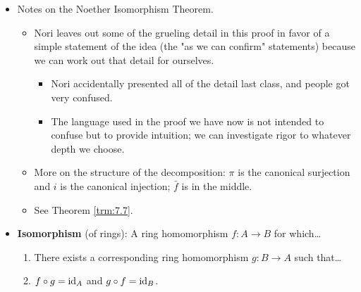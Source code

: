 \documentclass[../notes.tex]{subfiles}
\begin{document}
\begin{itemize}
\begin{proof}
        If we ignore $\times$ and regard $A,B$ as additive abelian groups, the FIT applies and yields the above (unique) factorization. In it, $\bar{f}$ is a bijective additive isomorphism (group homomorphism). Thus, this takes care of proving that $\bar{f}$ respects addition.\par
        We now just need to prove that $\bar{f}$ respects multiplication and sends 1 to 1 to complete our verification that it is a ring homomorphism. We will do this indirectly. First, observe that $f$ is a ring homomorphism and $i$ is an injective ring homomorphism. Thus, $\bar{f}\circ\pi=i^{-1}\circ f$ is a ring homomorphism (as we can confirm). This combined with the fact that $\pi$ is onto implies that $\bar{f}$ is a ring homomorphism (as we can confirm).\par
        This essentially completes our proof; we just need the formal definition of an isomorphism of rings to take it to the finish line.
    \end{proof}
    \item Notes on the Noether Isomorphism Theorem.
    \begin{itemize}
        \item Nori leaves out some of the grueling detail in this proof in favor of a simple statement of the idea (the "as we can confirm" statements) because we can work out that detail for ourselves.
        \begin{itemize}
            \item Nori accidentally presented all of the detail last class, and people got very confused.
            \item The language used in the proof we have now is not intended to confuse but to provide intuition; we can investigate rigor to whatever depth we choose.
        \end{itemize}
        \item More on the structure of the decomposition: $\pi$ is the canonical surjection and $i$ is the canonical injection; $\bar{f}$ is in the middle.
        \item See Theorem \ref{trm:7.7}.
    \end{itemize}
    \item \textbf{Isomorphism} (of rings): A ring homomorphism $f:A\to B$ for which\dots
    \begin{enumerate}[label={(\roman*)}]
        \item There exists a corresponding ring homomorphism $g:B\to A$ such that\dots
        \item $f\circ g=\operatorname{id}_A$ and $g\circ f=\operatorname{id}_B$.

\end{enumerate}
\end{itemize}
\end{document}
